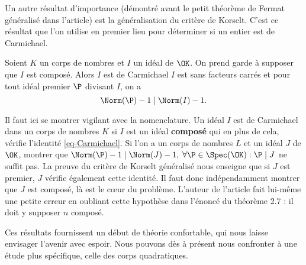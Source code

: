 Un autre résultat d'importance (démontré avant le petit théorème de Fermat généralisé dans l'article) est la généralisation du critère de Korselt. C'est ce résultat que l'on utilise en premier lieu pour déterminer si un entier est de Carmichael.

\begin{theoreme}
	Soient $K$ un corps de nombres et $I$ un idéal de $\OK$. On prend garde à supposer que $I$ est composé. Alors $I$ est de Carmichael \ssi $I$ est sans facteurs carrés et pour tout idéal premier $\P$ divisant $I$, on a $$\Norm(\P) - 1 \mid \Norm(I) - 1.$$
\end{theoreme}

\begin{remarque}
	Il faut ici se montrer vigilant avec la nomenclature. Un idéal $I$ est de Carmichael dans un corps de nombres $K$ si $I$ est un idéal \textbf{composé} qui en plus de cela, vérifie l'identité \ref{eq-Carmichael}. Si l'on a un corps de nombres $L$ et un idéal $J$ de $\OK$, montrer que $\Norm(\P) - 1\mid \Norm(J) - 1,\; \forall \P\in \Spec(\OK) : \P\mid J$ ne suffit pas. La preuve du critère de Korselt généralisé nous enseigne que si $J$ est premier, $J$ vérifie également cette identité. Il faut donc indépendamment montrer que $J$ est composé, là est le cœur du problème. L'auteur de l'article fait lui-même une petite erreur en oubliant cette hypothèse dans l'énoncé du théorème 2.7 : il doit y supposer $n$ composé.
\end{remarque}

Ces résultats fournissent un début de théorie confortable, qui nous laisse envisager l'avenir avec espoir. Nous pouvons dès à présent nous confronter à une étude plus spécifique, celle des corps quadratiques.
